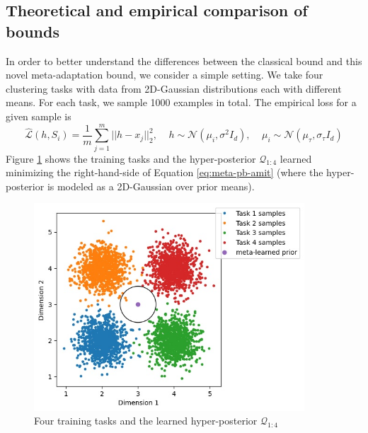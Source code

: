 \documentclass{article}
\theoremstyle{definition}
\newcommand{\LF}[1]{\textcolor{blue}{\{LF: #1\}}}
\begin{document}

\subsection{Theoretical and empirical comparison of bounds}

In order to better understand the differences between the classical bound and this novel meta-adaptation bound, we consider a simple setting. We take four clustering tasks with data from 2D-Gaussian distributions each with different means. 
For each task, we sample 1000 examples in total.
The empirical loss for a given sample is $$\hat{\mathcal{L}}(h,S_i)=\frac{1}{m}\sum_{j=1}^{m}||h-x_j||_2^2, \;\;\;\; h\sim \mathcal{N}(\mu_i,\sigma^2 I_d), \;\;\;\; \mu_i\sim \mathcal{N}(\mu_\tau,\sigma_\tau I_d)$$
Figure \ref{fig:ex-baseline} shows the training tasks and the hyper-posterior $\mathcal{Q}_{1:4}$ learned minimizing the right-hand-side of Equation \ref{eq:meta-pb-amit} (where the hyper-posterior is modeled as a 2D-Gaussian over prior means).

\begin{figure}
	\centering
	\includegraphics[width=0.9\textwidth]{toy_example_train.JPG}
	\caption{Four training tasks and the learned hyper-posterior $\mathcal{Q}_{1:4}$}
	\label{fig:ex-baseline}
\end{figure}
\end{document}
